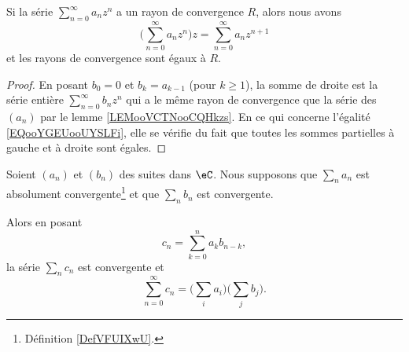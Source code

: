 \begin{lemma}        \label{LEMooLPBCooRWuvJB}
	Si la série \( \sum_{n=0}^{\infty}a_nz^n\) a un rayon de convergence \( R\), alors nous avons
	\begin{equation}		\label{EQooYGEUooUYSLFi}
		\big( \sum_{n=0}^{\infty}a_nz^n \big)z=\sum_{n=0}^{\infty}a_nz^{n+1}
	\end{equation}
	et les rayons de convergence sont égaux à \( R\).
\end{lemma}

\begin{proof}
	En posant \( b_0=0\) et \( b_{k}=a_{k-1}\) (pour \( k\geq 1\)), la somme de droite est la série entière \( \sum_{n=0}^{\infty}b_nz^n\) qui a le même rayon de convergence que la série des \( (a_n)\) par le lemme \ref{LEMooVCTNooCQHkzs}. En ce qui concerne l'égalité \eqref{EQooYGEUooUYSLFi}, elle se vérifie du fait que toutes les sommes partielles à gauche et à droite sont égales.
\end{proof}

\begin{proposition}       \label{PROPooPKGEooZKyxwo}
	Soient \( (a_n)\) et \( (b_n)\) des suites dans \( \eC\). Nous supposons que \( \sum_na_n\) est absolument convergente\footnote{Définition \ref{DefVFUIXwU}.} et que \( \sum_nb_n\) est convergente.

	Alors en posant
	\begin{equation}
		c_n=\sum_{k=0}^na_kb_{n-k},
	\end{equation}
	la série \( \sum_nc_n\) est convergente et
	\begin{equation}
		\sum_{n=0}^{\infty}c_n=\big( \sum_ia_i \big)\big( \sum_j b_j \big).
	\end{equation}
\end{proposition}

